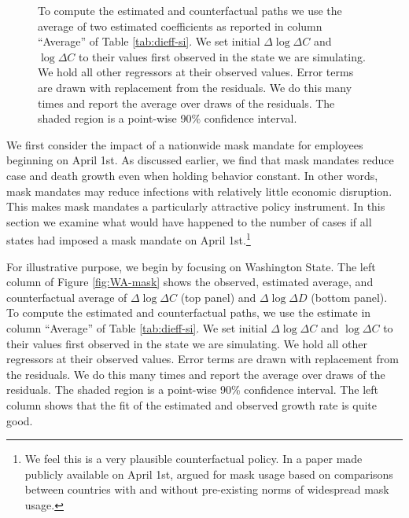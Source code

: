 \documentclass[11pt,reqno,letter]{amsart}
\theoremstyle{definition}
\begin{document}
\begin{figure}[ht]
\begin{minipage}{\linewidth}
\begin{tabular}{ccc}
    \end{tabular}
    \begin{flushleft}
      \footnotesize To compute the estimated and counterfactual paths
      we use the average of two estimated coefficients as reported in
      column ``Average'' of Table \ref{tab:dieff-si}. We set initial
      $\Delta \log \Delta C$ and $\log \Delta C$ to their values first
      observed in the state we are simulating. We hold all other
      regressors at their observed values. Error terms are drawn with
      replacement from the residuals. We do this many times and report
      the average over draws of the residuals. The shaded region is a
      point-wise 90\% confidence interval.
    \end{flushleft}
  \end{minipage}
\end{figure}



We first consider the impact of a nationwide mask mandate for
employees beginning on April 1st. As discussed earlier, we find that
mask mandates reduce case and death growth even when holding behavior
constant. In other words, mask mandates may reduce infections with
relatively little economic disruption. This makes mask mandates a
particularly attractive policy instrument. In this section we examine
what would have happened to the number of cases if all states had imposed a mask
mandate on April 1st.\footnote{We feel this is a very plausible
  counterfactual policy. In a paper made publicly available on
  April 1st, \cite{abaluck2020} argued for mask usage based on
  comparisons between countries with and without pre-existing norms of
  widespread mask usage.}

For illustrative purpose, we begin by focusing on Washington State.
The
left column of  Figure \ref{fig:WA-mask} shows the observed, estimated
average, and counterfactual average of $\Delta \log \Delta C$ (top panel) and
$\Delta \log \Delta D$ (bottom panel). To compute the estimated and counterfactual
paths, we use the   estimate   in
column ``Average'' of Table \ref{tab:dieff-si}. We set initial
$\Delta \log \Delta C$ and $\log \Delta C$ to their values first
observed in the state we are simulating. We hold all other regressors
at their observed values. Error terms are drawn with replacement from
the residuals. We do this many times and report the average over draws
of the residuals. The shaded region is a point-wise 90\% confidence
interval. The left column shows that the fit of the estimated and
observed growth rate is quite good.
\end{document}
